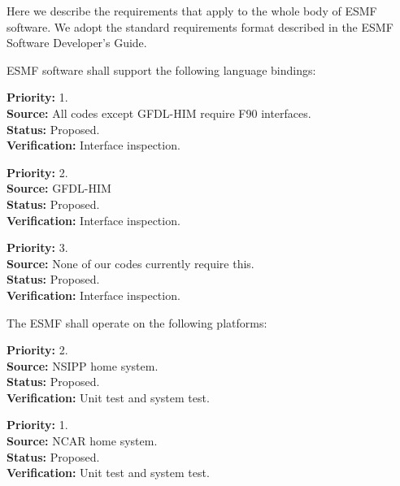 
Here we describe the requirements that apply to the whole body of 
ESMF software.  We adopt the standard requirements format described in 
the ESMF Software Developer's Guide.

ESMF software shall support the following language bindings:

\begin{reqlist}
{\bf Priority:} 1. \\
{\bf Source:} All codes except GFDL-HIM require F90 interfaces. \\
{\bf Status:} Proposed. \\
{\bf Verification:} Interface inspection. 
\end{reqlist}

\begin{reqlist}
{\bf Priority:} 2. \\
{\bf Source:} GFDL-HIM \\
{\bf Status:} Proposed. \\
{\bf Verification:} Interface inspection. 
\end{reqlist}

\begin{reqlist}
{\bf Priority:} 3. \\
{\bf Source:} None of our codes currently require this. \\
{\bf Status:} Proposed. \\
{\bf Verification:} Interface inspection.
\end{reqlist}

The ESMF shall operate on the following platforms:

\begin{reqlist}
{\bf Priority:} 2. \\
{\bf Source:} NSIPP home system. \\
{\bf Status:} Proposed. \\
{\bf Verification:} Unit test and system test.
\end{reqlist}

\begin{reqlist}
{\bf Priority:} 1. \\
{\bf Source:} NCAR home system. \\
{\bf Status:} Proposed. \\
{\bf Verification:} Unit test and system test.
\end{reqlist}

